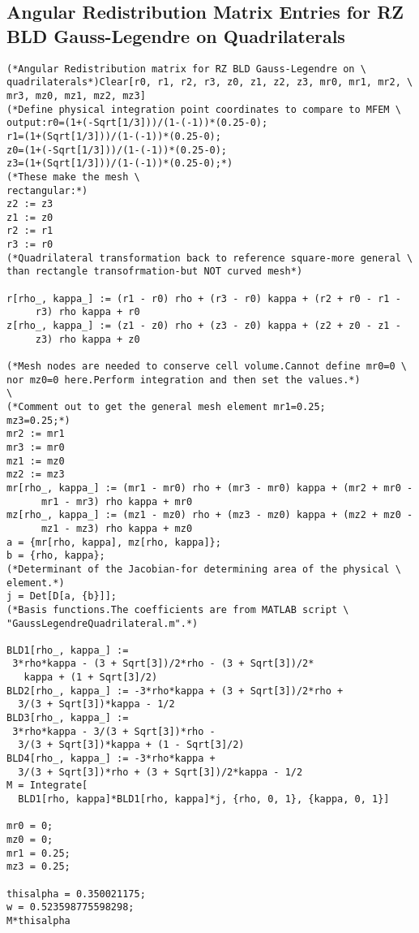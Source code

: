 \documentclass{article}
\begin{document}
\subsection{Angular Redistribution Matrix Entries for RZ BLD Gauss-Legendre on Quadrilaterals}

\begin{verbatim}
(*Angular Redistribution matrix for RZ BLD Gauss-Legendre on \
quadrilaterals*)Clear[r0, r1, r2, r3, z0, z1, z2, z3, mr0, mr1, mr2, \
mr3, mz0, mz1, mz2, mz3]
(*Define physical integration point coordinates to compare to MFEM \
output:r0=(1+(-Sqrt[1/3]))/(1-(-1))*(0.25-0);
r1=(1+(Sqrt[1/3]))/(1-(-1))*(0.25-0);
z0=(1+(-Sqrt[1/3]))/(1-(-1))*(0.25-0);
z3=(1+(Sqrt[1/3]))/(1-(-1))*(0.25-0);*)
(*These make the mesh \
rectangular:*)
z2 := z3
z1 := z0
r2 := r1
r3 := r0
(*Quadrilateral transformation back to reference square-more general \
than rectangle transofrmation-but NOT curved mesh*)

r[rho_, kappa_] := (r1 - r0) rho + (r3 - r0) kappa + (r2 + r0 - r1 - 
     r3) rho kappa + r0
z[rho_, kappa_] := (z1 - z0) rho + (z3 - z0) kappa + (z2 + z0 - z1 - 
     z3) rho kappa + z0

(*Mesh nodes are needed to conserve cell volume.Cannot define mr0=0 \
nor mz0=0 here.Perform integration and then set the values.*)
\
(*Comment out to get the general mesh element mr1=0.25;
mz3=0.25;*)
mr2 := mr1
mr3 := mr0
mz1 := mz0
mz2 := mz3
mr[rho_, kappa_] := (mr1 - mr0) rho + (mr3 - mr0) kappa + (mr2 + mr0 -
      mr1 - mr3) rho kappa + mr0
mz[rho_, kappa_] := (mz1 - mz0) rho + (mz3 - mz0) kappa + (mz2 + mz0 -
      mz1 - mz3) rho kappa + mz0
a = {mr[rho, kappa], mz[rho, kappa]};
b = {rho, kappa};
(*Determinant of the Jacobian-for determining area of the physical \
element.*)
j = Det[D[a, {b}]];
(*Basis functions.The coefficients are from MATLAB script \
"GaussLegendreQuadrilateral.m".*)

BLD1[rho_, kappa_] := 
 3*rho*kappa - (3 + Sqrt[3])/2*rho - (3 + Sqrt[3])/2*
   kappa + (1 + Sqrt[3]/2)
BLD2[rho_, kappa_] := -3*rho*kappa + (3 + Sqrt[3])/2*rho + 
  3/(3 + Sqrt[3])*kappa - 1/2
BLD3[rho_, kappa_] := 
 3*rho*kappa - 3/(3 + Sqrt[3])*rho - 
  3/(3 + Sqrt[3])*kappa + (1 - Sqrt[3]/2)
BLD4[rho_, kappa_] := -3*rho*kappa + 
  3/(3 + Sqrt[3])*rho + (3 + Sqrt[3])/2*kappa - 1/2
M = Integrate[
  BLD1[rho, kappa]*BLD1[rho, kappa]*j, {rho, 0, 1}, {kappa, 0, 1}]

mr0 = 0;
mz0 = 0;
mr1 = 0.25;
mz3 = 0.25;

thisalpha = 0.350021175;
w = 0.523598775598298;
M*thisalpha
\end{verbatim}
\end{document}
